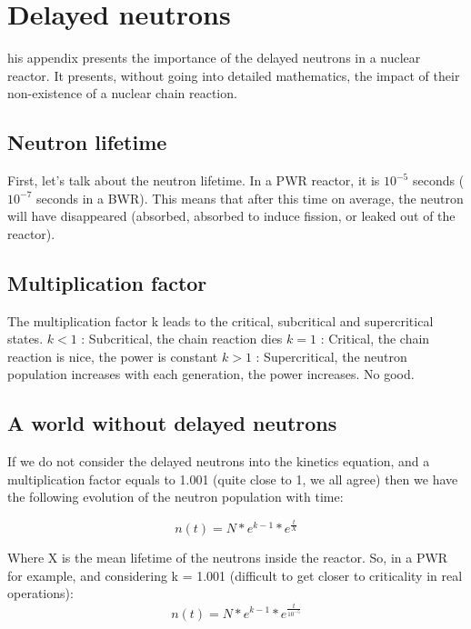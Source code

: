 %
%

\chapter{Delayed neutrons}
\label{app:app01}

his appendix presents the importance of the delayed neutrons in a nuclear reactor. It presents, without going into detailed mathematics, the impact of their non-existence of a nuclear chain reaction.

\section{Neutron lifetime}

First, let's talk about the neutron lifetime. In a PWR reactor, it is $10^{-5}$ seconds ($10^{-7}$ seconds in a BWR). This means that after this time on average, the  neutron will have disappeared (absorbed, absorbed to induce fission, or  leaked out of the reactor).

\section{Multiplication factor}
The multiplication factor k leads to the critical, subcritical and supercritical states.
$k < 1$ : Subcritical, the chain reaction dies
$k = 1$ : Critical, the chain reaction is nice, the power is constant
$k > 1$ : Supercritical, the neutron population increases with each generation, the power increases. No good.

\section{A world without delayed neutrons}

If we do not consider the delayed neutrons into the kinetics equation, and a multiplication factor equals to 1.001 (quite close to 1, we all agree) then we have the following evolution of the neutron population with time:

\begin{equation}\label{eq6}
n(t) = N*e^{k-1}*e^{\frac{t}{X}}
\end{equation}

Where X is the mean lifetime of the neutrons inside the reactor. So, in a PWR for example, and considering k = 1.001 (difficult to get closer to criticality in real operations):
\begin{equation}\label{eq7}
n(t) = N*e^{k-1}*e^{\frac{t}{10^{-5}}}
\end{equation}

